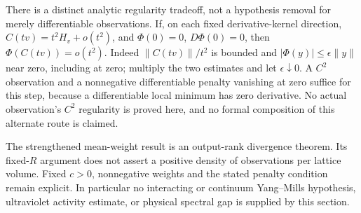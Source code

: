 \documentclass[11pt]{article}
\begin{document}
There is a distinct analytic regularity tradeoff, not a hypothesis removal
for merely differentiable observations. If, on each fixed derivative-kernel
direction, $C(tv)=t^2H_v+o(t^2)$, and $\Phi(0)=0$, $D\Phi(0)=0$, then
$\Phi(C(tv))=o(t^2)$. Indeed $\|C(tv)\|/t^2$ is bounded and
$|\Phi(y)|\leq\epsilon\|y\|$ near zero, including at zero; multiply the
two estimates and let $\epsilon\downarrow0$. A $C^2$ observation and a
nonnegative differentiable penalty vanishing at zero suffice for this
step, because a differentiable local minimum has zero derivative.
No actual observation's $C^2$ regularity is proved here, and no formal
composition of this alternate route is claimed.

The strengthened mean-weight result is an output-rank divergence theorem.
Its fixed-$R$ argument does not assert a positive density of observations
per lattice volume. Fixed $c>0$, nonnegative weights and the stated
penalty condition remain explicit. In particular no interacting or
continuum Yang--Mills hypothesis, ultraviolet activity estimate, or
physical spectral gap is supplied by this section.
\end{document}
